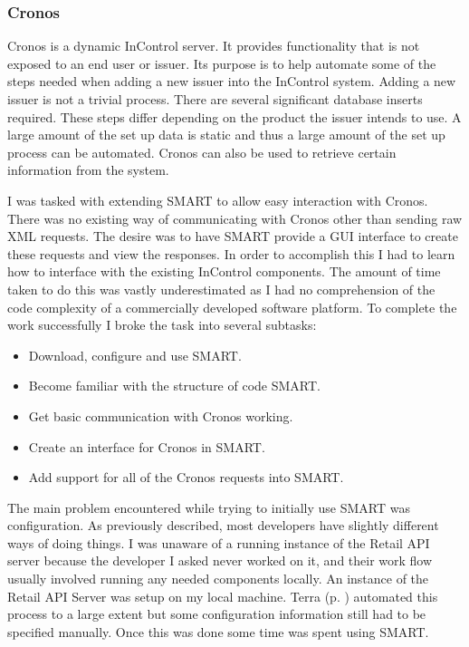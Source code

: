 \documentclass[a4paper, 11pt, titlepage]{article}
\begin{document}
 
\subsubsection{Cronos} 
Cronos is a dynamic InControl server. It provides functionality that is not exposed to an end user or issuer. Its purpose is to help automate some of the steps needed when adding a new issuer into the InControl system. Adding a new issuer is not a trivial process. There are several significant database inserts required. These steps differ depending on the product the issuer intends to use. A large amount of the set up data is static and thus a large amount of the set up process can be automated. Cronos can also be used to retrieve certain information from the system. 

I was tasked with extending SMART to allow easy interaction with Cronos. There was no existing way of communicating with Cronos other than sending raw XML requests. The desire was to have SMART provide a GUI interface to create these requests and view the responses. 
In order to accomplish this I had to learn how to interface with the existing InControl components. The amount of time taken to do this was vastly underestimated as I had no comprehension of the code complexity of a commercially developed software platform. To complete the work successfully I broke the task into several subtasks: \
\begin{itemize} 
\item Download, configure and use SMART.
\item Become familiar with the structure of code SMART. 
\item Get basic communication with Cronos working. 
\item Create an interface for Cronos in SMART. 
\item Add support for all of the Cronos requests into SMART. 
\end{itemize} 
The main problem encountered while trying to initially use SMART was configuration. As previously described, most developers have slightly different ways of doing things. I was unaware of a running instance of the Retail API server because the developer I asked never worked on it, and their work flow usually involved running any needed components locally. An instance of the Retail API Server was setup on my local machine. Terra (p. \pageref{Terra} ) automated this process to a large extent but some configuration information still had to be specified manually. Once this was done some time was spent using SMART.  
 
\end{document}
